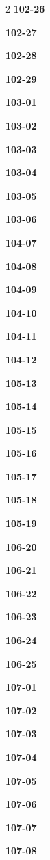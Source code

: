 \documentclass[10pt,a4paper]{article}
\begin{document}
\begin{multicols}{2}
\noindent\textbf{102-26}\ \par
\noindent\textbf{102-27}\ \par
\noindent\textbf{102-28}\ \par
\noindent\textbf{102-29}\ \par
\noindent\textbf{103-01}\ \par
\noindent\textbf{103-02}\ \par
\noindent\textbf{103-03}\ \par
\noindent\textbf{103-04}\ \par
\noindent\textbf{103-05}\ \par
\noindent\textbf{103-06}\ \par
\noindent\textbf{104-07}\ \par
\noindent\textbf{104-08}\ \par
\noindent\textbf{104-09}\ \par
\noindent\textbf{104-10}\ \par
\noindent\textbf{104-11}\ \par
\noindent\textbf{104-12}\ \par
\noindent\textbf{105-13}\ \par
\noindent\textbf{105-14}\ \par
\noindent\textbf{105-15}\ \par
\noindent\textbf{105-16}\ \par
\noindent\textbf{105-17}\ \par
\noindent\textbf{105-18}\ \par
\noindent\textbf{105-19}\ \par
\noindent\textbf{106-20}\ \par
\noindent\textbf{106-21}\ \par
\noindent\textbf{106-22}\ \par
\noindent\textbf{106-23}\ \par
\noindent\textbf{106-24}\ \par
\noindent\textbf{106-25}\ \par
\noindent\textbf{107-01}\ \par
\noindent\textbf{107-02}\ \par
\noindent\textbf{107-03}\ \par
\noindent\textbf{107-04}\ \par
\noindent\textbf{107-05}\ \par
\noindent\textbf{107-06}\ \par
\noindent\textbf{107-07}\ \par
\noindent\textbf{107-08}\ \par

\end{multicols}
\end{document}
